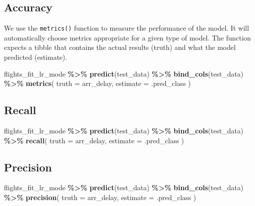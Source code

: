 \documentclass[
]{book}
\newenvironment{Shaded}{\begin{snugshade}}{\end{snugshade}}
\newcommand{\DataTypeTok}[1]{\textcolor[rgb]{0.13,0.29,0.53}{#1}}
\newcommand{\KeywordTok}[1]{\textcolor[rgb]{0.13,0.29,0.53}{\textbf{#1}}}
\newcommand{\NormalTok}[1]{#1}
\newcommand{\OperatorTok}[1]{\textcolor[rgb]{0.81,0.36,0.00}{\textbf{#1}}}
\newcommand{\StringTok}[1]{\textcolor[rgb]{0.31,0.60,0.02}{#1}}
\begin{document}
\hypertarget{accuracy}{%
\subsection{Accuracy}\label{accuracy}}

We use the \texttt{metrics()} function to measure the performance of the model. It will automatically choose metrics appropriate for a given type of model. The function expects a tibble that contains the actual results (truth) and what the model predicted (estimate).

\begin{Shaded}
\begin{Highlighting}[]
\NormalTok{flights\_fit\_lr\_mode }\OperatorTok{\%\textgreater{}\%}
\StringTok{  }\KeywordTok{predict}\NormalTok{(test\_data) }\OperatorTok{\%\textgreater{}\%}
\StringTok{  }\KeywordTok{bind\_cols}\NormalTok{(test\_data) }\OperatorTok{\%\textgreater{}\%}
\StringTok{  }\KeywordTok{metrics}\NormalTok{(}
    \DataTypeTok{truth =}\NormalTok{ arr\_delay,}
    \DataTypeTok{estimate =}\NormalTok{ .pred\_class}
\NormalTok{  )}
\end{Highlighting}
\end{Shaded}

\hypertarget{recall}{%
\subsection{Recall}\label{recall}}

\begin{Shaded}
\begin{Highlighting}[]
\NormalTok{flights\_fit\_lr\_mode }\OperatorTok{\%\textgreater{}\%}
\StringTok{  }\KeywordTok{predict}\NormalTok{(test\_data) }\OperatorTok{\%\textgreater{}\%}
\StringTok{  }\KeywordTok{bind\_cols}\NormalTok{(test\_data) }\OperatorTok{\%\textgreater{}\%}
\StringTok{  }\KeywordTok{recall}\NormalTok{(}
    \DataTypeTok{truth =}\NormalTok{ arr\_delay,}
    \DataTypeTok{estimate =}\NormalTok{ .pred\_class}
\NormalTok{  )}
\end{Highlighting}
\end{Shaded}

\hypertarget{precision}{%
\subsection{Precision}\label{precision}}

\begin{Shaded}
\begin{Highlighting}[]
\NormalTok{flights\_fit\_lr\_mode }\OperatorTok{\%\textgreater{}\%}
\StringTok{  }\KeywordTok{predict}\NormalTok{(test\_data) }\OperatorTok{\%\textgreater{}\%}
\StringTok{  }\KeywordTok{bind\_cols}\NormalTok{(test\_data) }\OperatorTok{\%\textgreater{}\%}
\StringTok{  }\KeywordTok{precision}\NormalTok{(}
    \DataTypeTok{truth =}\NormalTok{ arr\_delay,}
    \DataTypeTok{estimate =}\NormalTok{ .pred\_class}
\NormalTok{  )}
\end{Highlighting}
\end{Shaded}


  
\end{document}
